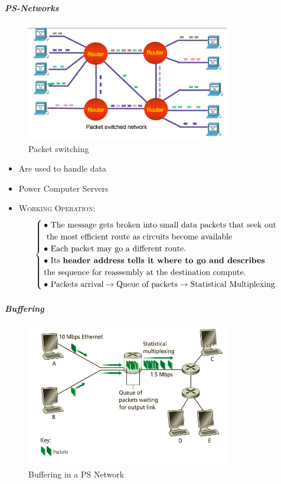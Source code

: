 \subparagraph{PS-Networks}
\begin{figure}
\centering
\includegraphics[width=0.8\textwidth]{PS.png}
\caption{\label{PS.png}Packet switching}
\end{figure}
\begin{itemize}
\item Are used to handle data
\item Power Computer Servers
\item \textsc{Working Operation:} 
\begin{equation}
\begin{cases}
\bullet \text{ The message gets broken into small data packets that seek out} \\ \text{ the most efficient route as circuits become available}\\
\bullet \text{ Each packet may go a different route.}\\
\bullet \text{ Its \textbf{header address tells it where to go and describes}} \\ \text{the sequence for reassembly at the destination compute.}\\
\bullet \text{ Packets arrival} \rightarrow \text{Queue of packets} \rightarrow \text{Statistical Multiplexing}
\end{cases}
\end{equation}
\end{itemize}
 
 
\subparagraph{Buffering}
\begin{figure}
\centering
\includegraphics[width=0.8\textwidth]{PSBuffering.png}
\caption{\label{PSBuffering.png}Buffering in a PS Network}
\end{figure}


